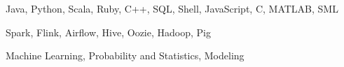 

\begin{cvparagraph}

    {
      \begin{cvitems}
        \vspace{4mm}
        \item {Java, Python, Scala, Ruby, C++, SQL, Shell, JavaScript, C, MATLAB, SML}
        \item {Spark, Flink, Airflow, Hive, Oozie, Hadoop, Pig}
        \item {Machine Learning, Probability and Statistics, Modeling}
        \vspace{4mm}
      \end{cvitems}
    }
\end{cvparagraph}